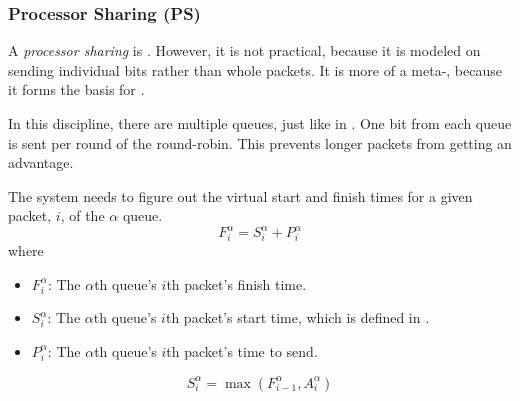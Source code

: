 \subsubsection{Processor Sharing (PS)}\label{subsubsec:Processor_Sharing}
\begin{definition}\label{def:Processor_Sharing}
  A \emph{processor sharing}  is .
  However, it is not practical, because it is modeled on sending individual bits rather than whole packets.
  It is more of a meta-, because it forms the basis for .

  In this discipline, there are multiple queues, just like in .
  One bit from each queue is sent per round of the round-robin.
  This prevents longer packets from getting an advantage.

  The system needs to figure out the virtual start and finish times for a given packet, $i$, of the $\alpha$ queue.
  \begin{equation}\label{eq:PS_Finish_Time}
    F_{i}^{\alpha} = S_{i}^{\alpha} + P_{i}^{\alpha}
  \end{equation}
  where
  \begin{itemize}[noitemsep]
  \item $F_{i}^{\alpha}$: The $\alpha$th queue's $i$th packet's finish time.
  \item $S_{i}^{\alpha}$: The $\alpha$th queue's $i$th packet's start time, which is defined in .
  \item $P_{i}^{\alpha}$: The $\alpha$th queue's $i$th packet's time to send.
  \end{itemize}

  \begin{equation}\label{eq:PS_Start_Time}
    S_{i}^{\alpha} = \max \left( F_{i-1}^{\alpha}, A_{i}^{\alpha} \right)
  \end{equation}
\end{definition}


